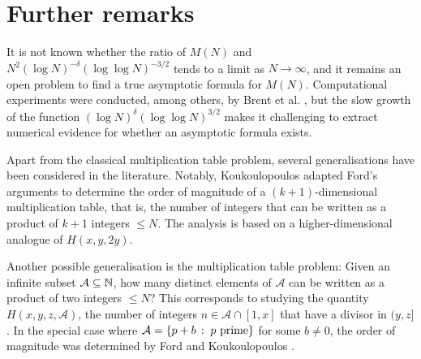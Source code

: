 \section{Further remarks}
    \label{sec:further-remarks}

It is not known whether the ratio of $M(N)$ and $N^2(\log N)^{-\delta} (\log \log N)^{-3/2}$ tends to a limit as $N \rightarrow \infty$, and it remains an open problem to find a true asymptotic formula for $M(N)$.
Computational experiments were conducted, among others, by Brent et al. \cite{algorithmsforthemtp}, but the slow growth of the function $(\log N)^\delta (\log \log N)^{3/2}$ makes it challenging to extract numerical evidence for whether an asymptotic formula exists.

Apart from the classical multiplication table problem, several generalisations have been considered in the literature. 
Notably, Koukoulopoulos \cite{localizedfactorizationsofintegers} adapted Ford's arguments to determine the order of magnitude of a $(k + 1)$-dimensional multiplication table, that is, the number of integers that can be written as a product of $k + 1$ integers $\le N$.
The analysis is based on a higher-dimensional analogue of $H(x, y, 2y)$.

Another possible generalisation is the  multiplication table problem:
Given an infinite subset $\mathcal A \subseteq \mathbb{N}$, how many distinct elements of $\mathcal A$ can be written as a product of two integers $\le N$?
This corresponds to studying the quantity $H(x, y, z, \mathcal A)$, the number of integers $n \in \mathcal A \cap[1, x]$ that have a divisor in $(y, z]$.
In the special case where $\mathcal A = \left\{p + b\,:\;p \text{ prime}\right\}$ for some $b \ne 0$, the order of magnitude was determined by Ford \cite{thedistributionofintegers} and Koukoulopoulos \cite{divisorsofshiftedprimes}.
